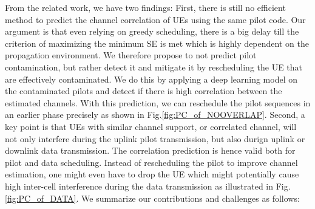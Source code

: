 From the related work, we have two findings: First, there is still no efficient method to predict %
the channel correlation of UEs %
using the same pilot code. Our argument is that even relying on greedy scheduling, there is a big delay till the criterion of maximizing the minimum SE is met which is highly dependent on the propagation environment. 
We therefore propose to not predict pilot contamination, but rather detect it and mitigate it by rescheduling the UE that are effectively contaminated. We do this by applying a deep learning model on the contaminated pilots and detect if there is high correlation between the estimated channels.%
With this prediction, we can reschedule the pilot sequences in an earlier phase precisely as shown in Fig.\ref{fig:PC_of_NOOVERLAP}. %
Second, a key point is that UEs with similar channel support, or correlated channel, will not only interfere during the uplink pilot transmission, but also durign uplink or downlink data transmission. The correlation prediction is hence valid both for pilot and data scheduling. 
Instead of rescheduling the pilot to improve channel estimation, one might even have to drop the UE which might potentially cause high inter-cell interference during the data transmission as illustrated in Fig. \ref{fig:PC_of_DATA}.  %
We summarize our contributions and challenges as follows:
